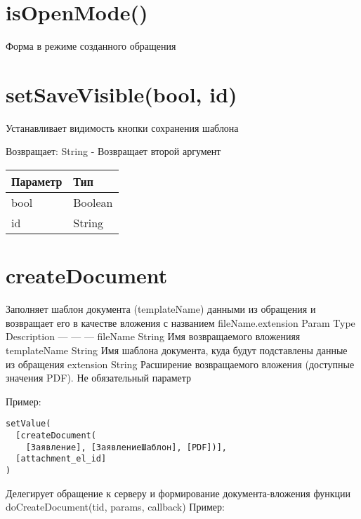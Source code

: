 \hypertarget{isopenmode-boolean}{%
\section{isOpenMode()}\label{isopenmode-boolean}}

Форма в режиме созданного обращения


\hypertarget{setsavevisiblebool-id-string}{%
\section{setSaveVisible(bool, id)}\label{setsavevisiblebool-id-string}}

Устанавливает видимость кнопки сохранения шаблона

Возвращает: String - Возвращает второй аргумент

\begin{longtable}[]{@{}ll@{}}
\toprule
Параметр & Тип\tabularnewline
\midrule
\endhead
bool & Boolean\tabularnewline
id & String\tabularnewline
\bottomrule
\end{longtable}

\hypertarget{filename-templatename-extension}{%
\section{createDocument}\label{filename-templatename-extension}}

Заполняет шаблон документа (templateName) данными из обращения и
возвращает его в качестве вложения с названием fileName.extension
\textbar{} Param \textbar{} Type \textbar{} Description \textbar{}
\textbar{} --- \textbar{} --- \textbar{} --- \textbar{} \textbar{}
fileName \textbar{} String \textbar{} Имя возвращаемого вложенияя
\textbar{} \textbar{} templateName \textbar{} String \textbar{} Имя
шаблона документа, куда будут подставлены данные из обращения \textbar{}
\textbar{} extension \textbar{} String \textbar{} Расширение
возвращаемого вложения (доступные значения PDF). Не обязательный
параметр \textbar{}

Пример:

\begin{verbatim}
setValue(
  [createDocument(
    [Заявление], [ЗаявлениеШаблон], [PDF])], 
  [attachment_el_id]
)

\end{verbatim}

Делегирует обращение к серверу и формирование документа-вложения функции
doCreateDocument(tid, params, callback) Пример:

